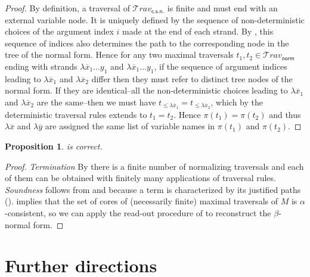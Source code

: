 \documentclass[xchauthor,chkrefs,GCNS,amsmath,amsthm,rotating,leaveRGB]{tcsg}
\theoremstyle{plain}
\newtheorem{proposition}[theorem]{Proposition}
\theoremstyle{definition}
\newcommand\travset{\mathcal{T}\!rav}
\newcommand{\normalizing}{\mathsf{norm}}
\newcommand{\travsetnorm}{\travset_{\normalizing}}
\newcommand{\travsetscn}{\travset_{\mathsf{c.s.n.}}}
\def\coresymbol{\pi}
\newcommand{\core}[1]{\coresymbol(#1)}
\begin{document}
\begin{proof}
By definition, a traversal of $\travsetscn $ is finite and must end with an
external variable node. It is uniquely defined by the sequence of
non-deterministic choices of the argument index $i$ made at the end of each
strand. By , this sequence of
indices also determines the path to the corresponding node in the tree of the
normal form. Hence for any two maximal traversals $t_{1},t_{2} \in
\travsetnorm $ ending with strands $\lambda \overline{x}_{1} \ldots y_{1}$
and $\lambda \overline{x}_{1} \ldots y_{1}$, if the sequence of argument
indices leading to $\lambda \overline{x}_{1}$ and $\lambda \overline{x}_{2}$
differ then they must refer to distinct tree nodes of the normal form. If
they are identical--all the non-deterministic choices leading to $\lambda
\overline{x}_{1}$ and $\lambda \overline{x}_{2}$ are the same--then we must
have $t_{\leq \lambda \overline{x}_{1}} = t_{\leq \lambda \overline{x}_{2}}$,
which by the deterministic traversal rules extends to $t_{1} = t_{2}$. Hence
$\core{t_{1}} = \core{t_{2}}$ and thus $\lambda \overline{x}$ and $\lambda
\overline{y}$ are assigned the same list of variable names in $\core{t_{1}}$
and $\core{t_{2}}$.
\end{proof}

\begin{proposition}
 is correct.
\end{proposition}

\begin{proof}
\emph{Termination}  By 
there is a finite number of normalizing traversals and each of them can be
obtained with finitely many applications of traversal rules. \emph{Soundness}
follows from  and because a term
is characterized by its justified paths
().
 implies
that the set of cores of (necessarily finite) maximal traversals of $M$ is
$\alpha $-consistent, so we can apply the read-out procedure of
to reconstruct the $\beta $-normal form.
\end{proof}



\section{Further directions}\label{sec8}
\end{document}
